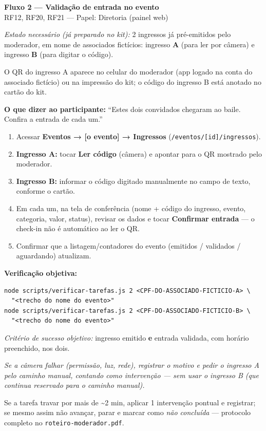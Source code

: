\documentclass[11pt,a4paper]{article}
\newcommand{\dizer}[1]{%
  \noindent\colorbox{lightbg}{%
    \begin{minipage}{0.95\linewidth}
    \vspace{1mm}
    \textbf{O que dizer ao participante:} ``#1''
    \vspace{1mm}
    \end{minipage}%
  }\vspace{3mm}
}
\newcommand{\criterio}[1]{\noindent\textit{Critério de sucesso objetivo:} #1}
\newcommand{\estado}[1]{\noindent\textit{Estado necessário (já preparado no kit):} #1\vspace{2mm}}
\begin{document}
\begin{center}
  {\LARGE\bfseries\color{brandgreen} Fluxo 2 --- Validação de entrada no evento}\\[1mm]
  {\large RF12, RF20, RF21 --- Papel: Diretoria (painel web)}
\end{center}

\vspace{2mm}
\estado{2 ingressos já pré-emitidos pelo moderador, em nome de associados fictícios: ingresso
\textbf{A} (para ler por câmera) e ingresso \textbf{B} (para digitar o código).}

O QR do ingresso A aparece no celular do moderador (app logado na conta do associado fictício) ou
na impressão do kit; o código do ingresso B está anotado no cartão do kit.

\dizer{Estes dois convidados chegaram ao baile. Confira a entrada de cada um.}

\begin{enumerate}[leftmargin=6mm]
  \item Acessar \textbf{Eventos → [o evento] → Ingressos} (\texttt{/eventos/[id]/ingressos}).
  \item \textbf{Ingresso A:} tocar \textbf{Ler código} (câmera) e apontar para o QR mostrado pelo
    moderador.
  \item \textbf{Ingresso B:} informar o código digitado manualmente no campo de texto, conforme o
    cartão.
  \item Em cada um, na tela de conferência (nome + código do ingresso, evento, categoria, valor,
    status), revisar os dados e tocar \textbf{Confirmar entrada} --- o check-in não é automático
    ao ler o QR.
  \item Confirmar que a listagem/contadores do evento (emitidos / validados / aguardando)
    atualizam.
\end{enumerate}

\textbf{Verificação objetiva:}
\begin{small}
\begin{verbatim}
node scripts/verificar-tarefas.js 2 <CPF-DO-ASSOCIADO-FICTICIO-A> \
  "<trecho do nome do evento>"
node scripts/verificar-tarefas.js 2 <CPF-DO-ASSOCIADO-FICTICIO-B> \
  "<trecho do nome do evento>"
\end{verbatim}
\end{small}
\criterio{ingresso emitido \textbf{e} entrada validada, com horário preenchido, nos dois.}

\vspace{2mm}
\noindent\textit{Se a câmera falhar (permissão, luz, rede), registrar o motivo e pedir o ingresso
A pelo caminho manual, contando como intervenção --- sem usar o ingresso B (que continua reservado
para o caminho manual).}

\vfill
\noindent\footnotesize Se a tarefa travar por mais de \textasciitilde2 min, aplicar 1 intervenção
pontual e registrar; se mesmo assim não avançar, parar e marcar como \textit{não concluída} ---
protocolo completo no \texttt{roteiro-moderador.pdf}.
\end{document}
